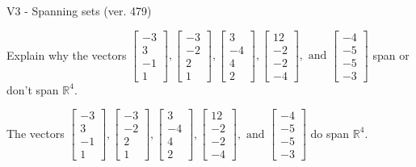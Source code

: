 \begin{exercise}
  \begin{exerciseTitle}V3 - Spanning sets (ver. 479)\end{exerciseTitle}
  \begin{exerciseStatement}
    Explain why the vectors \(\left[\begin{array}{r}
-3 \\
3 \\
-1 \\
1
\end{array}\right] , \left[\begin{array}{r}
-3 \\
-2 \\
2 \\
1
\end{array}\right] , \left[\begin{array}{r}
3 \\
-4 \\
4 \\
2
\end{array}\right] , \left[\begin{array}{r}
12 \\
-2 \\
-2 \\
-4
\end{array}\right] , \text{ and } \left[\begin{array}{r}
-4 \\
-5 \\
-5 \\
-3
\end{array}\right]\) span or don't span \(\mathbb{R}^4\). 
	


  \end{exerciseStatement}
  \begin{exerciseAnswer}
   The vectors \(\left[\begin{array}{r}
-3 \\
3 \\
-1 \\
1
\end{array}\right] , \left[\begin{array}{r}
-3 \\
-2 \\
2 \\
1
\end{array}\right] , \left[\begin{array}{r}
3 \\
-4 \\
4 \\
2
\end{array}\right] , \left[\begin{array}{r}
12 \\
-2 \\
-2 \\
-4
\end{array}\right] , \text{ and } \left[\begin{array}{r}
-4 \\
-5 \\
-5 \\
-3
\end{array}\right]\) 
  	 do  
	span \(\mathbb{R}^4\).
  



\end{exerciseAnswer}
\end{exercise}
